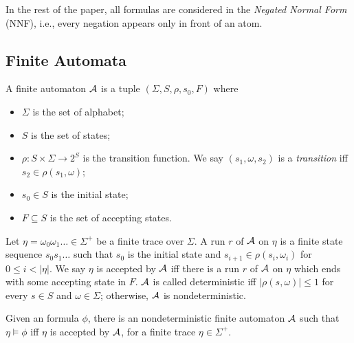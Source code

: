 In the rest of the paper, all \ltlf formulas are considered in the \emph{Negated Normal Form} (NNF), i.e., every negation appears only in front of an atom. 

\subsection{Finite Automata}
\noindent A finite automaton $\mathcal{A}$ is a tuple $(\Sigma, S, \rho, s_0, F)$ where 
\begin{itemize}
	\item $\Sigma$ is the set of alphabet;
	\item $S$ is the set of states;
	\item $\rho: S\times\Sigma \rightarrow 2^S$ is the transition function. We say $(s_1,\omega, s_2)$ is a \emph{transition} iff $s_2\in\rho(s_1,\omega)$;
	\item $s_0\in S$ is the initial state;
	\item $F\subseteq S$ is the set of accepting states. 
\end{itemize}
Let $\eta=\omega_0\omega_1\ldots\in\Sigma^+$ be a finite trace over $\Sigma$. A run $r$ of $\mathcal{A}$ on $\eta$ is a finite state sequence $s_0 s_1\ldots$ such that $s_0$ is the initial state and $s_{i+1}\in\rho(s_i,\omega_i)$ for $0\leq i < |\eta|$. We say $\eta$ is accepted by $\mathcal{A}$ iff there is a run $r$ of $\mathcal{A}$ on $\eta$ which ends with some accepting state in $F$. $\mathcal{A}$ is called deterministic iff $|\rho(s,\omega)| \leq 1$ for every $s\in S$ and $\omega\in\Sigma$; otherwise, $\mathcal{A}$ is nondeterministic.   

\begin{theorem}[\cite{GV13}]
Given an \ltlf formula $\phi$, there is an nondeterministic finite automaton $\mathcal{A}$ such that $\eta\models\phi$ iff $\eta$ is accepted by $\mathcal{A}$, for a finite trace $\eta\in\Sigma^+$.
\end{theorem}
\iffalse
\begin{proof} 
($\Leftarrow$) If $\eta$ can be accepted by the \NFA $\A_{\phi}$, there exists a finite trace $\eta$ s.t. the corresponding run $r$ of $\A_{\phi}$ on $\eta$ ends with an accepting state $\phi_n$. According to Definition \ref{def:ltlf2nfa}, $\eta \models \phi$. 

($\Rightarrow$) Since $\eta$ is a finite trace, $\eta \models \phi$. According to Lemma \ref{lem:finiteSat}, there is a run $r= \phi_0 \to \phi_1 \to ...\phi_n$ such that $\phi_n$ is an accepting state. According to Definition \ref{def:ltlf2nfa}, $\eta$ can be accepted by the \NFA $\A_{\phi}$.
\end{proof}
\fi

